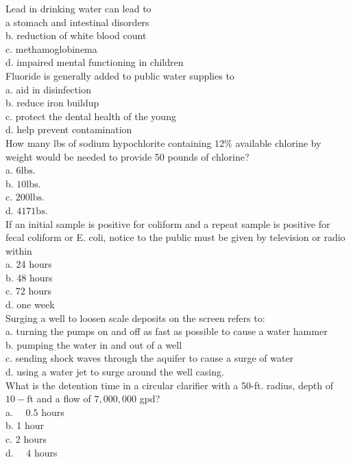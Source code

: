 Lead in drinking water can lead to\\
a stomach and intestinal disorders\\
b. reduction of white blood count\\
c. methamoglobinema\\
d. impaired mental functioning in children\\

Fluoride is generally added to public water supplies to\\
a. aid in disinfection\\
b. reduce iron buildup\\
c. protect the dental health of the young\\
d. help prevent contamination \\

How many lbs of sodium hypochlorite containing $12 \%$ available chlorine by weight would be needed to provide 50 pounds of chlorine?\\
a. $6 \mathrm{lbs}$.\\
b. $10 \mathrm{lbs}$.\\
c. $200 \mathrm{lbs}$.\\
d. $4171 \mathrm{bs}$.\\

If an initial sample is positive for coliform and a repeat sample is positive for fecal coliform or E. coli, notice to the public must be given by television or radio within\\
a. 24 hours\\
b. 48 hours\\
c. 72 hours\\
d. one week\\

Surging a well to loosen scale deposits on the screen refers to:\\
a. turning the pumps on and off as fast as possible to cause a water hammer\\
b. pumping the water in and out of a well\\
c. sending shock waves through the aquifer to cause a surge of water\\
d. using a water jet to surge around the well casing.\\

What is the detention time in a circular clarifier with a 50-ft. radius, depth of $10-\mathrm{ft}$ and a flow of $7,000,000$ gpd?\\
a. $\quad 0.5$ hours\\
b. 1 hour\\
c. 2 hours\\
d. $\quad 4$ hours\\


